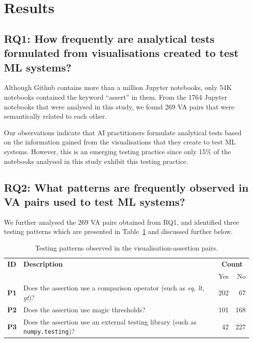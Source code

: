 \documentclass[conference]{IEEEtran}
\begin{document}
\section{Results}\label{sec:result}
\subsection{RQ1: How frequently are analytical tests formulated from visualisations created to test ML systems?}\label{sec:result-rq1}

Although Github contains more than a million Jupyter notebooks, only 54K notebooks contained the keyword ``assert'' in them. From the 1764 Jupyter notebooks that were analysed in this study, we found 269 VA pairs that were semantically related to each other.

Our observations indicate that AI practitioners formulate analytical tests based on the information gained from the visualisations that they create to test ML systems. However, this is an emerging testing practice since only 15\% of the notebooks analysed in this study exhibit this testing practice.

\subsection{RQ2: What patterns are frequently observed in VA pairs used to test ML systems?}\label{sec:result-rq2}

We further analysed the 269 VA pairs obtained from RQ1, and identified three testing patterns which are presented in Table~\ref{tab:testing-patterns} and discussed further below.

\begin{table}
  \centering
  \caption{Testing patterns observed in the visualisation-assertion pairs.}
  \begin{tabularx}{0.45\textwidth}{@{}l X r r@{}}
    \toprule
    \textbf{ID} &
    \textbf{Description} &
    \multicolumn{2}{c}{\textbf{Count}}\\
    & & Yes & No\\
    \midrule
    \textbf{P1} &
    Does the assertion use a comparison operator (such as \emph{eq, lt, gt})? &
    202 & 67\\
    \textbf{P2} &
    Does the assertion use magic thresholds? &
    101 & 168\\
    \textbf{P3} &
    Does the assertion use an external testing library (such as \texttt{numpy.testing})? &
    42 & 227\\
    \bottomrule
  \end{tabularx}
  \label{tab:testing-patterns}
\end{table}
\end{document}
